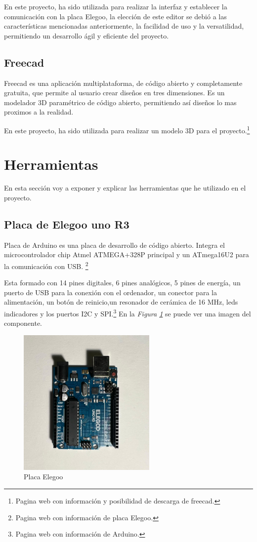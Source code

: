 En este proyecto, ha sido utilizada para realizar la interfaz y establecer la comunicación con la placa Elegoo, la elección de este editor se debió a las características mencionadas anteriormente, la facilidad de uso y la versatilidad, permitiendo un desarrollo ágil y eficiente del proyecto.
\subsection{Freecad}
Freecad es una aplicación multiplataforma, de código abierto y completamente gratuita, que permite al usuario crear diseños en tres dimensiones.
Es un modelador 3D paramétrico de código abierto, permitiendo así diseños lo mas proximos a la realidad.

En este proyecto, ha sido utilizada para realizar un modelo 3D para el proyecto.\cite{freecad}\footnote{Pagina web con información y posibilidad de descarga de freecad\cite{freecad}.} 

\section{Herramientas}
En esta sección voy a exponer y explicar las herramientas que he utilizado en el proyecto.
\subsection{Placa de Elegoo uno R3}
Placa de Arduino es una placa de desarrollo de código abierto. 
Integra el microcontrolador chip Atmel ATMEGA+328P principal y un ATmega16U2 para la comunicación con USB. \cite{Elegoo}\footnote{Pagina web con información de placa Elegoo\cite{Elegoo}.}

Esta formado con 14 pines digitales, 6 pines analógicos, 5 pines de energía, un puerto de USB para la conexión con el ordenador, un conector para la alimentación, un botón de reinicio,un resonador de cerámica de 16 MHz, leds indicadores y los puertos I2C y SPI.\cite{Arduino}\footnote{Pagina web con información de Arduino\cite{Arduino}.}
En la \textit{Figura \ref{fig:Placa Elegoo}} se puede ver una imagen del componente.
\begin{figure}[h]
        \centering
        \includegraphics[angle=90,width=0.6\textwidth]{img/placa elegoo.png}
        \caption{Placa Elegoo}
        \label{fig:Placa Elegoo}
    \end{figure}

